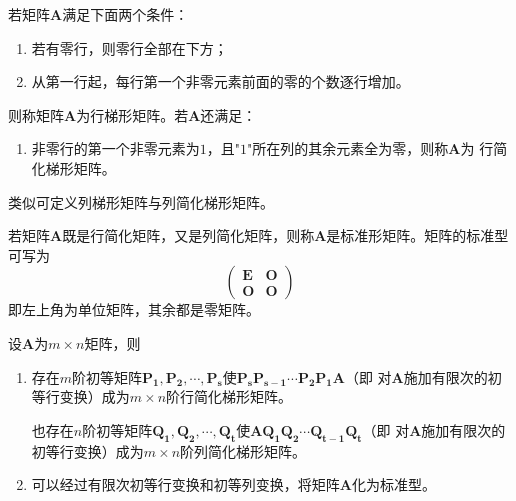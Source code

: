 \begin{definition}[梯形矩阵]
    若矩阵$\boldsymbol{A}$满足下面两个条件：
    \begin{enumerate}[(1)]
        \item 若有零行，则零行全部在下方；
        \item 从第一行起，每行第一个非零元素前面的零的个数逐行增加。
    \end{enumerate}
    则称矩阵$\boldsymbol{A}$为{\heiti 行梯形矩阵}。若$\boldsymbol{A}$还满足：
    \begin{enumerate}[(3)]
        \item 非零行的第一个非零元素为$1$，且"$1$"所在列的其余元素全为零，则称$\boldsymbol{A}$为
        {\heiti 行简化梯形矩阵}。
    \end{enumerate}

    类似可定义{\heiti 列梯形矩阵}与{\heiti 列简化梯形矩阵}。
\end{definition}

\begin{theorem}[矩阵的标准型]
    若矩阵$\boldsymbol{A}$既是行简化矩阵，又是列简化矩阵，则称$\boldsymbol{A}$是{\heiti 标准形矩阵}。矩阵的标准型可写为
    $$\left(\begin{array}{cc}
        \boldsymbol{E} & \boldsymbol{O}\\
        \boldsymbol{O} & \boldsymbol{O}
    \end{array}\right)$$
    即左上角为单位矩阵，其余都是零矩阵。
\end{theorem}

\begin{theorem}[矩阵的化简]
    设$\boldsymbol{A}$为$m\times n$矩阵，则
    \begin{enumerate}[(1)]
        \item 存在$m$阶初等矩阵$\boldsymbol{P_1},\boldsymbol{P_2},\cdots,\boldsymbol{P_s}$使$\boldsymbol{P_s}\boldsymbol{P_{s-1}}\cdots\boldsymbol{P_2}\boldsymbol{P_1}\boldsymbol{A}$（即
        对$\boldsymbol{A}$施加有限次的初等行变换）成为$m\times n$阶行简化梯形矩阵。

        也存在$n$阶初等矩阵$\boldsymbol{Q_1},\boldsymbol{Q_2},\cdots,\boldsymbol{Q_t}$使$\boldsymbol{A}\boldsymbol{Q_1}\boldsymbol{Q_2}\cdots\boldsymbol{Q_{t-1}}\boldsymbol{Q_t}$（即
        对$\boldsymbol{A}$施加有限次的初等行变换）成为$m\times n$阶列简化梯形矩阵。
        \item 可以经过有限次初等行变换和初等列变换，将矩阵$\boldsymbol{A}$化为标准型。
    \end{enumerate}
\end{theorem}

